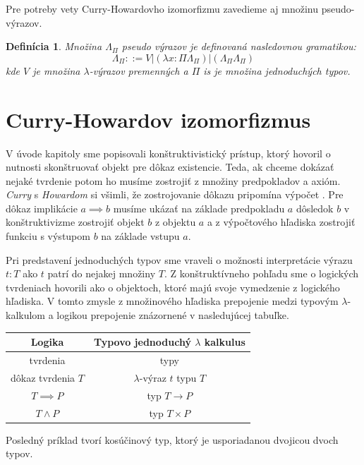 \documentclass[a4paper,10pt,oneside]{report}%
\newtheorem{definition}{Definícia}[chapter]
\begin{document}
Pre potreby vety Curry-Howardovho izomorfizmu zavedieme aj množinu pseudo-výrazov.

\begin{definition}
        Množina $\Lambda_{\Pi}$ pseudo výrazov je definovaná nasledovnou gramatikou:
    \begin{equation*}
        \Lambda_{\Pi} ::= V | (\lambda x : \Pi \Lambda_{\Pi}) | (\Lambda_{\Pi} \Lambda_{\Pi})
    \end{equation*}
    kde $V$ je množina $\lambda$-výrazov premenných a $\Pi$ is je množina jednoduchých typov.
\end{definition}

\section{Curry-Howardov izomorfizmus}

    V úvode kapitoly sme popisovali konštruktivistický prístup, ktorý hovoril
o nutnosti skonštruovať objekt pre dôkaz existencie.
    Teda, ak chceme dokázať nejaké tvrdenie potom ho musíme zostrojiť z množiny
predpokladov a axióm.
    \emph{Curry} s \emph{Howardom} si všimli, že zostrojovanie dôkazu pripomína výpočet \cite{programming_languages}.
    Pre dôkaz implikácie $a \implies b$ musíme ukázať na základe predpokladu $a$
dôsledok $b$ v konštruktivizme zostrojiť objekt $b$ z objektu $a$ a
z výpočtového hľadiska zostrojiť funkciu s výstupom $b$ na základe vstupu $a$.

    Pri predstavení jednoduchých typov sme vraveli o možnosti interpretácie výrazu
$t : T$ ako $t$ patrí do nejakej množiny $T$.
    Z konštruktívneho pohľadu sme o logických tvrdeniach hovorili ako o objektoch,
ktoré majú svoje vymedzenie z logického hľadiska.
    V tomto zmysle z množinového hľadiska prepojenie medzi typovým $\lambda$-kalkulom
a logikou prepojenie znázornené v nasledujúcej tabuľke.
\begin{center}
    \begin{tabular}{ c c }
        Logika &                Typovo jednoduchý $\lambda$ kalkulus \\
        \hline
        tvrdenia                & typy \\
        dôkaz tvrdenia $T$      & $\lambda$-výraz $t$ typu $T$ \\
        $T \implies P$          & typ $T \to P$ \\
        $T \wedge P$            & typ $T \times P$
    \end{tabular}
\end{center}
    Posledný príklad tvorí kosúčinový typ, ktorý je usporiadanou dvojicou dvoch typov.
\end{document}
